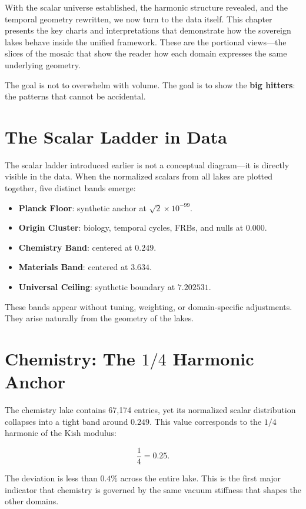 \documentclass[11pt, letterpaper, openany]{book}
\begin{document}
With the scalar universe established, the harmonic structure revealed, and the temporal geometry
rewritten, we now turn to the data itself. This chapter presents the key charts and interpretations
that demonstrate how the sovereign lakes behave inside the unified framework. These are the
portional views—the slices of the mosaic that show the reader how each domain expresses the same
underlying geometry.

The goal is not to overwhelm with volume.  
The goal is to show the \textbf{big hitters}: the patterns that cannot be accidental.

\section*{The Scalar Ladder in Data}
The scalar ladder introduced earlier is not a conceptual diagram—it is directly visible in the data.
When the normalized scalars from all lakes are plotted together, five distinct bands emerge:

\begin{itemize}
    \item \textbf{Planck Floor}: synthetic anchor at $\sqrt{2}\times 10^{-99}$.
    \item \textbf{Origin Cluster}: biology, temporal cycles, FRBs, and nulls at $0.000$.
    \item \textbf{Chemistry Band}: centered at $0.249$.
    \item \textbf{Materials Band}: centered at $3.634$.
    \item \textbf{Universal Ceiling}: synthetic boundary at $7.202531$.
\end{itemize}

These bands appear without tuning, weighting, or domain-specific adjustments.  
They arise naturally from the geometry of the lakes.

\section*{Chemistry: The $1/4$ Harmonic Anchor}
The chemistry lake contains 67,174 entries, yet its normalized scalar distribution collapses into a
tight band around $0.249$. This value corresponds to the $1/4$ harmonic of the Kish modulus:



\[
\frac{1}{4} = 0.25.
\]



The deviation is less than $0.4\%$ across the entire lake.  
This is the first major indicator that chemistry is governed by the same vacuum stiffness that shapes
the other domains.
\end{document}
